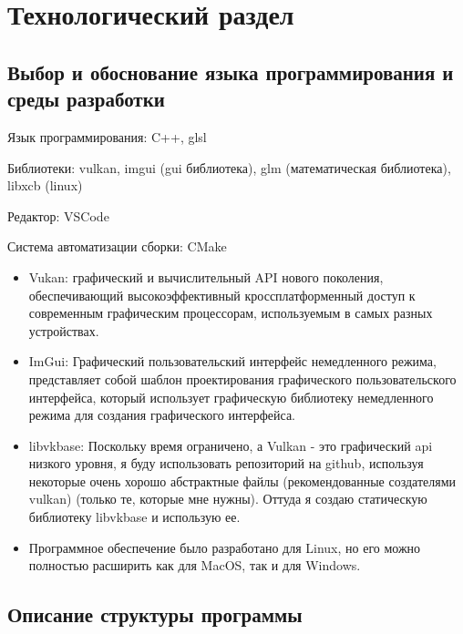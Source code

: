 \chapter{Технологический раздел}
\label{cha:impl}


\section{Выбор и обоснование языка программирования и среды разработки}

Язык программирования: C++, glsl

Библиотеки: vulkan, imgui (gui библиотека), glm (математическая библиотека), libxcb (linux)

Редактор: VSCode

Система автоматизации сборки: CMake



\begin{itemize}
    \item Vukan: графический и вычислительный API нового поколения,
    обеспечивающий высокоэффективный кроссплатформенный доступ к
    современным графическим процессорам, используемым в самых разных устройствах.

    \item ImGui: Графический пользовательский интерфейс немедленного режима,
    представляет собой шаблон проектирования графического пользовательского интерфейса,
    который использует графическую библиотеку немедленного режима
    для создания графического интерфейса.

    \item libvkbase: Поскольку время ограничено, а Vulkan - это графический api
    низкого уровня, я буду использовать репозиторий на github, используя некоторые
    очень хорошо абстрактные файлы (рекомендованные создателями vulkan)
    (только те, которые мне нужны). Оттуда я создаю статическую библиотеку libvkbase и использую ее.
    
    \item Программное обеспечение было разработано для Linux, но его можно
    полностью расширить как для MacOS, так и для Windows.
\end{itemize}

\section{Описание структуры программы}

